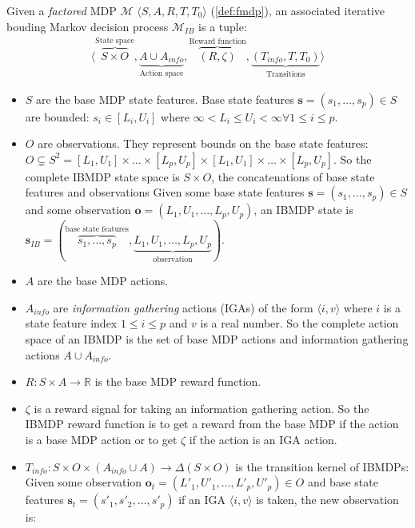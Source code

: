 \begin{definition}\label{def:ibmdp}
Given a \textit{factored} MDP $\mathcal{M}$ $\langle S, A, R, T, T_0 \rangle$ (\ref{def:fmdp}), an associated iterative bouding Markov decision process $\mathcal{M}_{IB}$ is a tuple:
\begin{align*}
    \langle \overbrace{S \times O}^{\text{State space}}, \underbrace{A \cup A_{info}}_{\text{Action space}}, \overbrace{(R, \zeta)}^{\text{Reward function}}, \underbrace{(T_{info}, T, T_0)}_{\text{Transitions}}\rangle
\end{align*}

\begin{itemize}
\item $S$ are the base MDP state features. Base state features $\boldsymbol{s} = (s_1, \dots, s_p)\in S$ are bounded: $s_i \in [L_i, U_i]$ where $\infty < L_i \leq U_i < \infty \forall 1\leq i \leq p$.
\item $O$ are observations. They represent bounds on the base state features: $O\subsetneq S^2 =  [L_1, U_1]\times \dots \times [L_p, U_p] \times [L_1, U_1]\times \dots \times [L_p, U_p]$. So the complete IBMDP state space is $S \times O$, the concatenations of base state features and observations
Given some base state features $\boldsymbol{s} = (s_1, \dots, s_p)\in S$ and some observation $\boldsymbol{o} = (L_1, U_1, \dots, L_p, U_p)$, an IBMDP state is $\boldsymbol{s}_{IB} = (\overbrace{s_1, \dots, s_p}^{\text{base state features}}, \underbrace{L_1, U_1, \dots, L_p, U_p}_{\text{observation}})$.
\item $A$ are the base MDP actions.
\item $A_{info}$ are \textit{information gathering} actions (IGAs) of the form $\langle i, v \rangle$ where $i$ is a state feature index $1 \leq i \leq p$ and $v$ is a real number. So the complete action space of an IBMDP is the set of base MDP actions and information gathering actions $A \cup A_{info}$.
\item $R: S\times A \rightarrow \mathbb{R}$ is the base MDP reward function.
\item $\zeta$ is a reward signal for taking an information gathering action.
So the IBMDP reward function is to get a reward from the base MDP if the action is a base MDP action or to get $\zeta$ if the action is an IGA action.
\item $T_{info}: S\times O \times( A_{info} \cup A )\rightarrow \Delta (S\times O)$ is the transition kernel of IBMDPs: 
Given some observation $\boldsymbol{o}_t = (L'_1, U'_1, \dots, L'_p, U'_p) \in O$ and base state features $\boldsymbol{s}_t=(s'_1, s'_2, \dots, s'_p)$ if an IGA $\langle i, v \rangle$ is taken, the new observation is:

\end{itemize}
\end{definition}
